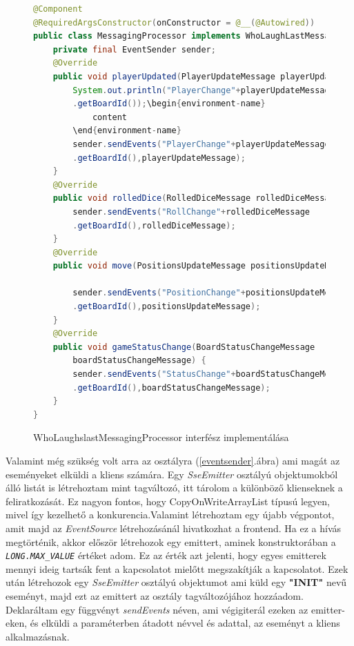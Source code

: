 \documentclass[a4paper,twoside]{article}
\begin{document}
\begin{figure}
	\caption{WhoLaughslastMessagingProcessor interfész implementálása}
	\begin{lstlisting}[language=java,breaklines=true]	
@Component
@RequiredArgsConstructor(onConstructor = @__(@Autowired))
public class MessagingProcessor implements WhoLaughLastMessagingProcessor{
	private final EventSender sender;
	@Override
	public void playerUpdated(PlayerUpdateMessage playerUpdateMessage) {
		System.out.println("PlayerChange"+playerUpdateMessage
		.getBoardId());\begin{environment-name}
			content
		\end{environment-name}
		sender.sendEvents("PlayerChange"+playerUpdateMessage
		.getBoardId(),playerUpdateMessage);
	}
	@Override
	public void rolledDice(RolledDiceMessage rolledDiceMessage) {
		sender.sendEvents("RollChange"+rolledDiceMessage
		.getBoardId(),rolledDiceMessage);
	}
	@Override
	public void move(PositionsUpdateMessage positionsUpdateMessage) {
		
		sender.sendEvents("PositionChange"+positionsUpdateMessage
		.getBoardId(),positionsUpdateMessage);
	}
	@Override
	public void gameStatusChange(BoardStatusChangeMessage
		boardStatusChangeMessage) {
		sender.sendEvents("StatusChange"+boardStatusChangeMessage
		.getBoardId(),boardStatusChangeMessage);
	}
}
		\end{lstlisting}
		\label{messproc}
	\end{figure} 
	\FloatBarrier
Valamint még szükség volt arra az osztályra (\ref{eventsender}.ábra) ami magát az eseményeket elküldi a kliens számára.  Egy \textit{SseEmitter} osztályú objektumokból álló listát is létrehoztam mint tagváltozó, itt tárolom a különböző klienseknek a feliratkozását. Ez nagyon fontos, hogy CopyOnWriteArrayList típusú legyen, mivel így kezelhető a konkurencia.Valamint létrehoztam egy újabb végpontot, amit majd az \textit{EventSource} létrehozásánál hivatkozhat a frontend.  Ha ez a hívás megtörténik, akkor először létrehozok egy emittert, aminek konstruktorában a \textit{\texttt{LONG.MAX\_VALUE}} értéket adom. Ez az érték azt jelenti, hogy egyes emitterek mennyi ideig tartsák fent a kapcsolatot mielőtt megszakítják a kapcsolatot. Ezek után létrehozok egy \textit{SseEmitter} osztályú objektumot ami küld egy \textbf{"INIT"} nevű eseményt, majd ezt az emittert az osztály tagváltozójához hozzáadom. Deklaráltam egy függvényt \textit{sendEvents} néven, ami végigiterál ezeken az emitter-eken, és elküldi a paraméterben átadott névvel és adattal, az eseményt a kliens alkalmazásnak.   
\end{document}
